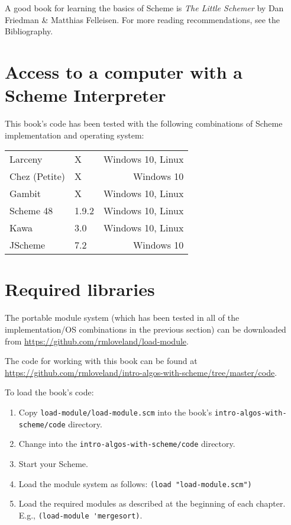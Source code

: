 \documentclass[12pt,openright,draft]{book}
\begin{document}
A good book for learning the basics of Scheme is \emph{The Little
  Schemer} by Dan Friedman \& Matthias Felleisen.  For more
reading recommendations, see the Bibliography. %

\section{Access to a computer with a Scheme Interpreter}

This book's code has been tested with the following combinations of
Scheme implementation and operating system:

\begin{tabular}{ l m r }
Larceny        & X     & Windows 10, Linux \\
Chez (Petite)  & X     & Windows 10        \\
Gambit         & X     & Windows 10, Linux \\
Scheme 48      & 1.9.2 & Windows 10, Linux \\
Kawa           & 3.0   & Windows 10, Linux \\
JScheme        & 7.2   & Windows 10
\end{tabular}

\section{Required libraries}

The portable module system (which has been tested in all of the
implementation/OS combinations in the previous section) can be
downloaded from \url{https://github.com/rmloveland/load-module}.

The code for working with this book can be found at
\url{https://github.com/rmloveland/intro-algos-with-scheme/tree/master/code}.

To load the book's code:

\begin{enumerate}

\item Copy \verb|load-module/load-module.scm| into the book's
  \verb|intro-algos-with-scheme/code| directory.

\item Change into the \verb|intro-algos-with-scheme/code| directory.

\item Start your Scheme.

\item Load the module system as follows:
  \verb|(load "load-module.scm")|

\item Load the required modules as described at the beginning of each
  chapter.
  E.g., \verb|(load-module 'mergesort)|.

\end{enumerate}
\end{document}
